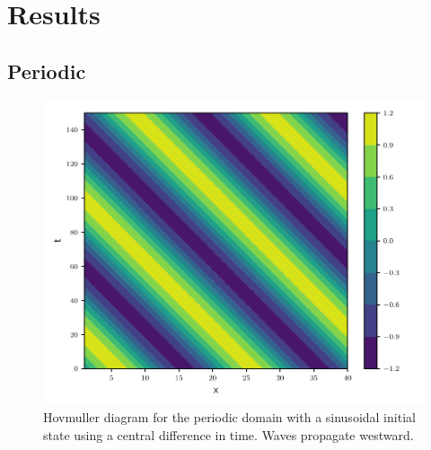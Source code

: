 \section{Results}




\subsection{Periodic}



\begin{figure}[htp]
  \centering
  \includegraphics[width=\textwidth]{../figures/psi_periodic_centered_short.pdf}
  \caption{Hovmuller diagram for the periodic domain with a sinusoidal initial
  state using a central difference in time. Waves propagate westward.}
  \label{fig:periodic_sine}
\end{figure}


